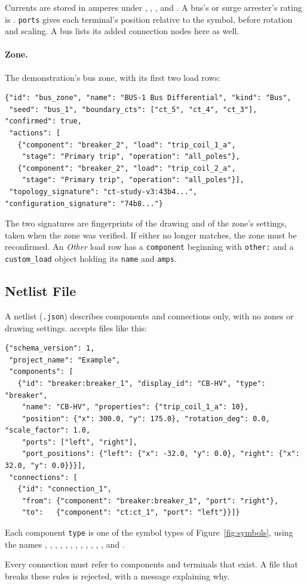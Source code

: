 Currents are stored in amperes under , ,
,  and . A bus's or surge
arrester's rating is .
\texttt{ports} gives each terminal's position relative to the symbol, before
rotation and scaling. A bus lists its added connection nodes here as well.

\paragraph{Zone.} The demonstration's bus zone, with its first two load rows:
\begin{lstlisting}
{"id": "bus_zone", "name": "BUS-1 Bus Differential", "kind": "Bus",
 "seed": "bus_1", "boundary_cts": ["ct_5", "ct_4", "ct_3"], "confirmed": true,
 "actions": [
   {"component": "breaker_2", "load": "trip_coil_1_a",
    "stage": "Primary trip", "operation": "all_poles"},
   {"component": "breaker_2", "load": "trip_coil_2_a",
    "stage": "Primary trip", "operation": "all_poles"}],
 "topology_signature": "ct-study-v3:43b4...", "configuration_signature": "74b8..."}
\end{lstlisting}

The two signatures are fingerprints of the drawing and of the zone's settings, taken
when the zone was verified. If either no longer matches, the zone must be
reconfirmed. An \emph{Other} load row has a \texttt{component} beginning with
\texttt{other:} and a \texttt{custom\_load} object holding its \texttt{name} and
\texttt{amps}.

\subsection{Netlist File}

A netlist (\texttt{.json}) describes components and connections only, with no zones or
drawing settings.  accepts files like this:

\begin{lstlisting}
{"schema_version": 1,
 "project_name": "Example",
 "components": [
   {"id": "breaker:breaker_1", "display_id": "CB-HV", "type": "breaker",
    "name": "CB-HV", "properties": {"trip_coil_1_a": 10},
    "position": {"x": 300.0, "y": 175.0}, "rotation_deg": 0.0, "scale_factor": 1.0,
    "ports": ["left", "right"],
    "port_positions": {"left": {"x": -32.0, "y": 0.0}, "right": {"x": 32.0, "y": 0.0}}}],
 "connections": [
   {"id": "connection_1",
    "from": {"component": "breaker:breaker_1", "port": "right"},
    "to":   {"component": "ct:ct_1", "port": "left"}}]}
\end{lstlisting}

{\raggedright Each component \texttt{type} is one of the symbol types of
Figure~\ref{fig:symbols}, using the names , ,
, , , , , ,
, , , ,
 and .\par} Every
connection must refer to components and terminals that exist. A file that breaks
these rules is rejected, with a message explaining why.
